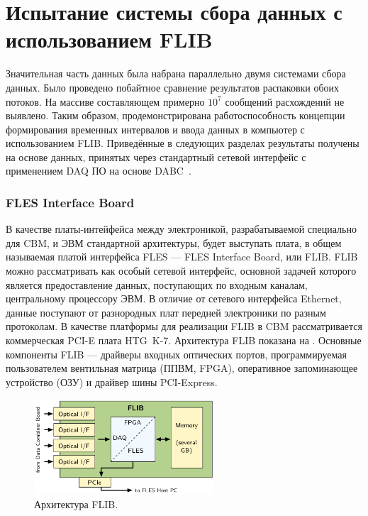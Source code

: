 \section{Испытание системы сбора данных с использованием FLIB}\label{section:flib}

Значительная часть данных была набрана параллельно двумя системами сбора данных. Было проведено побайтное сравнение результатов распаковки обоих потоков. На массиве составляющем примерно $ 10^{7} $ сообщений расхождений не выявлено. Таким образом, продемонстрирована работоспособность концепции формирования временных интервалов и ввода данных в компьютер с использованием FLIB. Приведённые в следующих разделах результаты получены на основе данных, принятых через стандартный сетевой интерфейс с применением DAQ ПО на основе DABC~\cite{DABC}.

\subsubsection{FLES Interface Board}\label{sec:FLIB}

В качестве платы-интейфейса между электроникой, разрабатываемой специально для CBM, и ЭВМ стандартной архитектуры, будет выступать плата, в общем называемая платой интерфейса FLES --- FLES Interface Board, или FLIB. FLIB можно рассматривать как особый сетевой интерфейс, основной задачей которого является предоставление данных, поступающих по входным каналам, центральному процессору ЭВМ. В отличие от сетевого интерфейса Ethernet, данные поступают от разнородных плат передней электроники по разным протоколам. В качестве платформы для реализации FLIB в CBM рассматривается коммерческая PCI-E плата HTG~K-7. Архитектура FLIB показана на . Основные компоненты FLIB --- драйверы входных оптических портов, программируемая пользователем вентильная матрица (ППВМ, FPGA), оперативное запоминающее устройство (ОЗУ) и драйвер шины PCI-Express. 

\begin{figure}[H]
\centering
\includegraphics[width=0.6\textwidth]{pictures/FLIBarch.png}
\caption{Архитектура FLIB.}
\label{fig:FLIBarch}
\end{figure}